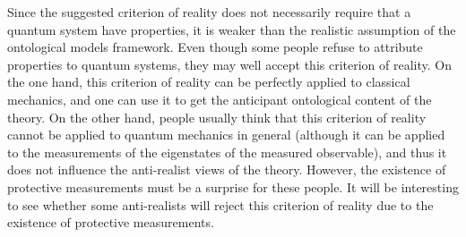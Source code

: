 
Since the suggested criterion of reality does not necessarily require that a quantum system have properties, it is weaker than the realistic assumption of the ontological models framework. Even though some people refuse to attribute properties to quantum systems, they may well accept this criterion of reality. On the one hand, this criterion of reality can be perfectly applied to classical mechanics, and one can use it to get the anticipant ontological content of the theory. On the other hand, people usually think that this criterion of reality cannot be applied to quantum mechanics in general (although it can be applied to the measurements of the eigenstates of the measured observable), and thus it does not influence the anti-realist views of the theory. However, the existence of protective measurements must be a surprise for these people. It will be interesting to see whether some anti-realists will reject this criterion of reality due to the existence of protective measurements.

